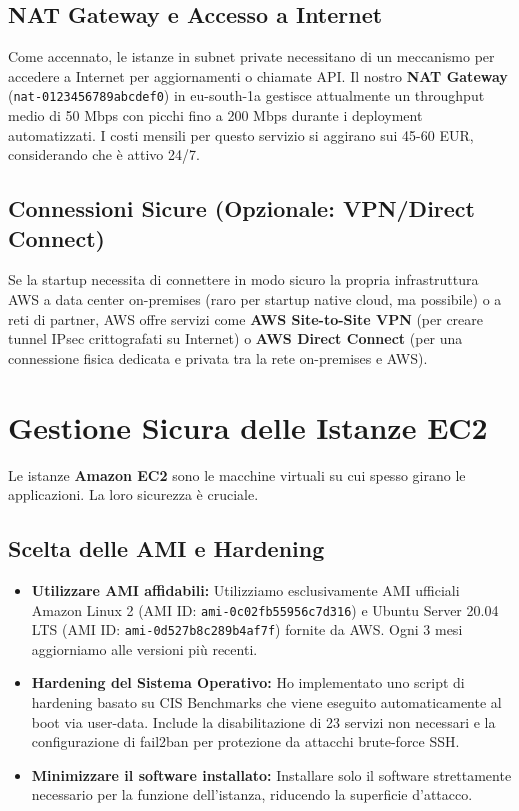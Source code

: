 \subsection{NAT Gateway e Accesso a Internet}
\label{subsec:nat-gateway}
Come accennato, le istanze in subnet private necessitano di un meccanismo per accedere a Internet per aggiornamenti o chiamate API. Il nostro \textbf{NAT Gateway} (\texttt{nat-0123456789abcdef0}) in eu-south-1a gestisce attualmente un throughput medio di 50 Mbps con picchi fino a 200 Mbps durante i deployment automatizzati. I costi mensili per questo servizio si aggirano sui 45-60 EUR, considerando che è attivo 24/7.

\subsection{Connessioni Sicure (Opzionale: VPN/Direct Connect)}
\label{subsec:vpn-directconnect}
Se la startup necessita di connettere in modo sicuro la propria infrastruttura AWS a data center on-premises (raro per startup native cloud, ma possibile) o a reti di partner, AWS offre servizi come \textbf{AWS Site-to-Site VPN} (per creare tunnel IPsec crittografati su Internet) o \textbf{AWS Direct Connect} (per una connessione fisica dedicata e privata tra la rete on-premises e AWS).

\section{Gestione Sicura delle Istanze EC2}
\label{sec:ec2-security}
Le istanze \textbf{Amazon EC2} sono le macchine virtuali su cui spesso girano le applicazioni. La loro sicurezza è cruciale.

\subsection{Scelta delle AMI e Hardening}
\label{subsec:ami-hardening}
\begin{itemize}
    \item \textbf{Utilizzare AMI affidabili:} Utilizziamo esclusivamente AMI ufficiali Amazon Linux 2 (AMI ID: \texttt{ami-0c02fb55956c7d316}) e Ubuntu Server 20.04 LTS (AMI ID: \texttt{ami-0d527b8c289b4af7f}) fornite da AWS. Ogni 3 mesi aggiorniamo alle versioni più recenti.
    \item \textbf{Hardening del Sistema Operativo:} Ho implementato uno script di hardening basato su CIS Benchmarks che viene eseguito automaticamente al boot via user-data. Include la disabilitazione di 23 servizi non necessari e la configurazione di fail2ban per protezione da attacchi brute-force SSH.
    \item \textbf{Minimizzare il software installato:} Installare solo il software strettamente necessario per la funzione dell'istanza, riducendo la superficie d'attacco.
\end{itemize}

